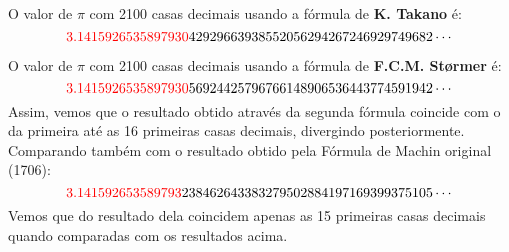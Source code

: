 \documentclass[12pt]{article}
\begin{document}
O valor de \(\pi\) com 2100 casas decimais usando a fórmula de \textbf{K. Takano} é: 
\[\textcolor{red}{3.1415926535897930}42929663938552056294267246929749682\cdots\]

O valor de \(\pi\) com 2100 casas decimais usando a fórmula de \textbf{F.C.M. Størmer} é: 
\[\textcolor{red}{3.1415926535897930}56924425796766148906536443774591942\cdots\]
Assim, vemos que o resultado obtido através da segunda fórmula coincide com o da primeira até as 16 primeiras casas decimais, divergindo posteriormente.\\

Comparando também com o resultado obtido pela Fórmula de Machin original (1706):
\[\textcolor{red}{3.141592653589793}238462643383279502884197169399375105\cdots\]
Vemos que do resultado dela coincidem apenas as 15 primeiras casas decimais quando comparadas com os resultados acima.
\end{document}

